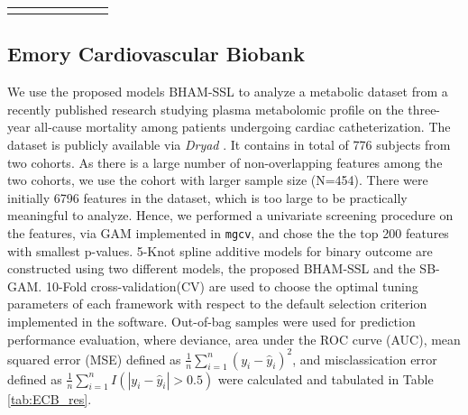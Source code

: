 \documentclass[AMA,STIX1COL,]{WileyNJD-v2}
\begin{document}
\begin{longtable}[c]{|p{0.75in}|p{0.75in}|p{0.75in}|p{0.75in}|p{0.75in}|p{0.75in}|p{0.75in}}
\noalign{\global\setlength{\arrayrulewidth}{2pt}}\arrayrulecolor[HTML]{666666}\cline{1-7}



\end{longtable}

\hypertarget{emory-cardiovascular-biobank}{%
\subsection{Emory Cardiovascular
Biobank}\label{emory-cardiovascular-biobank}}

We use the proposed models BHAM-SSL to analyze a metabolic dataset from
a recently published research \citep{Mehta2020} studying plasma
metabolomic profile on the three-year all-cause mortality among patients
undergoing cardiac catheterization. The dataset is publicly available
via \textit{Dryad} \citep{Mehta2020_data}. It contains in total of 776
subjects from two cohorts. As there is a large number of non-overlapping
features among the two cohorts, we use the cohort with larger sample
size (N=454). There were initially 6796 features in the dataset, which
is too large to be practically meaningful to analyze. Hence, we
performed a univariate screening procedure on the features, via GAM
implemented in \texttt{mgcv}, and chose the the top 200 features with
smallest p-values. 5-Knot spline additive models for binary outcome are
constructed using two different models, the proposed BHAM-SSL and the
SB-GAM. 10-Fold cross-validation(CV) are used to choose the optimal
tuning parameters of each framework with respect to the default
selection criterion implemented in the software. Out-of-bag samples were
used for prediction performance evaluation, where deviance, area under
the ROC curve (AUC), mean squared error (MSE) defined as
\(\frac{1}{n}\sum\limits^{n}_{i=1}(y_i - \hat y_i)^2\), and
misclassication error defined as
\(\frac{1}{n}\sum\limits^{n}_{i=1}I(|y_i - \hat y_i|>0.5)\) were
calculated and tabulated in Table \ref{tab:ECB_res}.

\providecommand{\docline}[3]{\noalign{\global\setlength{\arrayrulewidth}{#1}}\arrayrulecolor[HTML]{#2}\cline{#3}}

\setlength{\tabcolsep}{2pt}

\renewcommand*{\arraystretch}{1.5}
\end{document}

